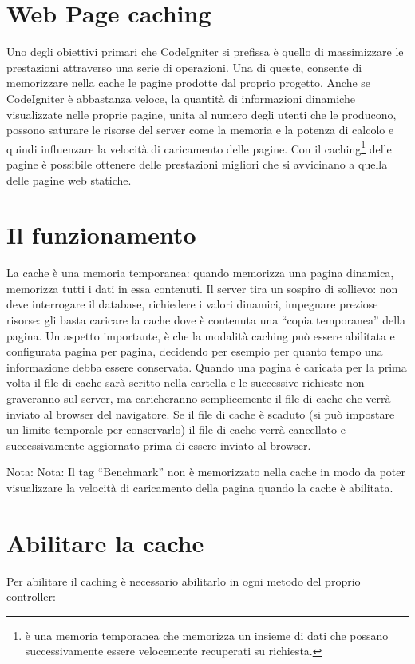 \section{Web Page caching}
\label{cap:cache}

Uno degli obiettivi primari che CodeIgniter si prefissa è quello di massimizzare le prestazioni attraverso una serie di operazioni. Una di queste, consente di memorizzare nella cache le pagine prodotte dal proprio progetto. Anche se CodeIgniter è abbastanza veloce, la quantità di informazioni dinamiche visualizzate nelle proprie pagine, unita al numero degli utenti che le producono, possono saturare le risorse del server come la memoria e la potenza di calcolo e quindi influenzare la velocità di caricamento delle pagine. Con il caching\footnote{è una memoria temporanea che memorizza un insieme di dati che possano successivamente essere velocemente recuperati su richiesta.} delle pagine è possibile ottenere delle prestazioni migliori che si avvicinano a quella delle pagine web statiche.

\section*{Il funzionamento}
La cache è una memoria temporanea: quando memorizza una pagina dinamica, memorizza tutti i dati in essa contenuti. Il server tira un sospiro di sollievo: non deve interrogare il database, richiedere i valori dinamici, impegnare preziose risorse: gli basta caricare la cache dove è contenuta una ``copia temporanea'' della pagina. Un aspetto importante, è che la modalità caching può essere abilitata e configurata pagina per pagina, decidendo per esempio per quanto tempo una informazione debba essere conservata. Quando una pagina è caricata per la prima volta il file di cache sarà scritto nella cartella  e le successive richieste non graveranno sul server, ma caricheranno semplicemente il file di cache che verrà inviato al browser del navigatore. Se il file di cache è scaduto (si può impostare un limite temporale per conservarlo) il file di cache verrà cancellato e successivamente aggiornato prima di essere inviato al browser.

Nota: Nota: Il tag ``Benchmark'' non è memorizzato nella cache in modo da poter visualizzare la velocità di caricamento della pagina quando la cache è abilitata.

\section*{Abilitare la cache}
Per abilitare il caching è necessario abilitarlo in ogni metodo del proprio controller:


